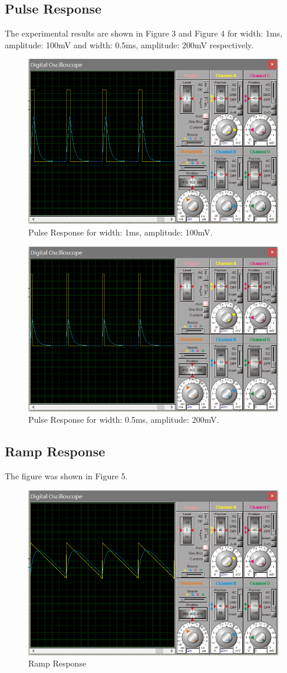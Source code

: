 \documentclass[a4paper]{article}
\begin{document}
\subsection{Pulse Response}
The experimental results are shown in Figure 3 and Figure 4 for width: 1ms, amplitude: 100mV and width: 0.5ms, amplitude: 200mV respectively.
\begin{figure}[H]
	\centering
	\includegraphics[width=0.8\linewidth]{4.png}
	\caption{Pulse Response for width: 1ms, amplitude: 100mV.}
\end{figure}
\begin{figure}[H]
	\centering
	\includegraphics[width=0.8\linewidth]{5.png}
	\caption{Pulse Response for width: 0.5ms, amplitude: 200mV.}
\end{figure}
\subsection{Ramp Response}
The figure was shown in Figure 5.
\begin{figure}[H]
	\centering
	\includegraphics[width=0.8\linewidth]{3.png}
	\caption{Ramp Response}
\end{figure}
\end{document}
